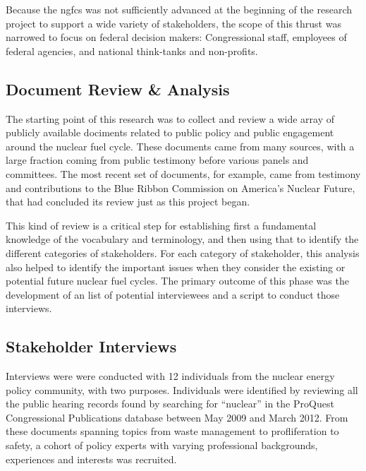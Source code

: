 Because the \gls{ngfcs} was not sufficiently advanced at the beginning of the
research project to support a wide variety of stakeholders, the scope of this
thrust was narrowed to focus on federal decision makers: Congressional staff,
employees of federal agencies, and national think-tanks and non-profits.

\subsection{Document Review \& Analysis}

The starting point of this research was to collect and review a wide array of
publicly available dociments related to public policy and public engagement
around the nuclear fuel cycle.  These documents came from many sources, with a
large fraction coming from public testimony before various panels and
committees.  The most recent set of documents, for example, came from
testimony and contributions to the Blue Ribbon Commission on America's Nuclear
Future, that had concluded its review just as this project began.

This kind of review is a critical step for establishing first a fundamental
knowledge of the vocabulary and terminology, and then using that to identify
the different categories of stakeholders.  For each category of stakeholder,
this analysis also helped to identify the important issues when they consider
the existing or potential future nuclear fuel cycles.  The primary outcome of
this phase was the development of an list of potential interviewees and a
script to conduct those interviews.

\subsection{Stakeholder Interviews}

Interviews were were conducted with 12 individuals from the nuclear energy
policy community, with two purposes.  Individuals were identified by reviewing
all the public hearing records found by searching for ``nuclear'' in the
ProQuest Congressional Publications database between May 2009 and March 2012.
From these documents spanning topics from waste management to profliferation
to safety, a cohort of policy experts with varying professional backgrounds,
experiences and interests was recruited.


